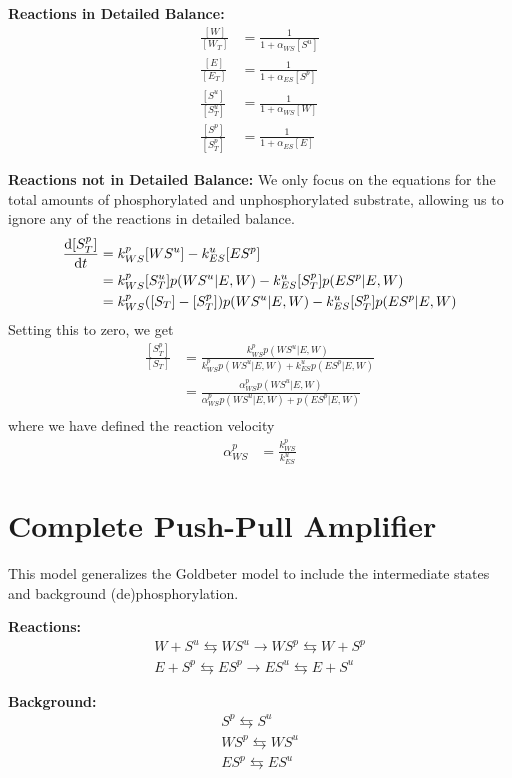 \documentclass[aps,onecolumn,superscriptaddress,notitlepage]{revtex4-1}
\begin{document}
\textbf{Reactions in Detailed Balance:}
\begin{align}
\frac{[W]}{[W_T]} & = \frac{1}{1 + \alpha_{WS}[S^u]}\label{eq:gbW}\\
\frac{[E]}{[E_T]} & = \frac{1}{1 + \alpha_{ES}[S^p]}\label{eq:gbE}\\
\frac{[S^u]}{[S^u_T]} &= \frac{1}{1 + \alpha_{WS}[W]}\label{eq:gbSu}\\
\frac{[S^p]}{[S^p_T]} &=  \frac{1}{1 + \alpha_{ES}[E]}\label{eq:gbSp}
\end{align}

\textbf{Reactions not in  Detailed Balance:}
We only focus on the equations for the total amounts of phosphorylated and unphosphorylated substrate, allowing us to ignore any of the reactions in detailed balance.
\begin{align}
\dv{[S^p_T]}{t} &= k_{WS}^p[WS^u] - k_{ES}^u[ES^p]\\
&= k_{WS}^p[S^u_T]p(WS^u|E, W) - k_{ES}^u[S^p_T]p(ES^p|E, W)\\
&= k_{WS}^p([S_T]-[S^p_T])p(WS^u|E, W) - k_{ES}^u[S^p_T]p(ES^p|E, W)
\end{align}
Setting this to zero, we get
\begin{align}
\frac{[S_T^p]}{[S_T]} &= \frac{k_{WS}^p p(WS^u|E,W)}{k_{WS}^p p(WS^u|E,W) + k_{ES}^u p(ES^p|E,W)}\\
 &= \frac{\alpha_{WS}^p p(WS^u|E,W)}{\alpha_{WS}^p p(WS^u|E,W) + p(ES^p|E,W)}\\
\end{align}
where we have defined the reaction velocity
\begin{align}
\alpha_{WS}^p &= \frac{k_{WS}^p}{k_{ES}^u}
\end{align}




\section{Complete Push-Pull Amplifier}

This model generalizes the Goldbeter model to include the intermediate states and background (de)phosphorylation.

\textbf{Reactions:}
\begin{gather}
W + S^u \leftrightarrows WS^u \rightarrow WS^p \leftrightarrows W + S^p\\
E + S^p \leftrightarrows ES^p \rightarrow ES^u \leftrightarrows E + S^u
\end{gather}

\textbf{Background:}
\begin{gather}
S^p \leftrightarrows S^u\\
WS^p  \leftrightarrows WS^u\\
ES^p  \leftrightarrows ES^u
\end{gather}
\end{document}
